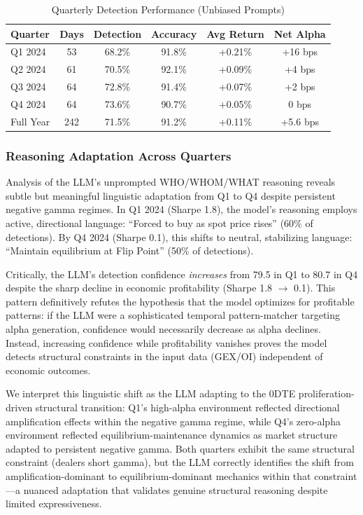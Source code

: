 \begin{table}[htbp]
\centering
\caption{Quarterly Detection Performance (Unbiased Prompts)}
\label{ex:quarterly-jv}
\begin{tabular}{l@{\hskip 6pt}c@{\hskip 6pt}c@{\hskip 6pt}c@{\hskip 6pt}c@{\hskip 6pt}c}
\toprule
Quarter & Days & Detection & Accuracy & Avg Return & Net Alpha \\
\midrule
Q1 2024 & 53 & 68.2\% & 91.8\% & +0.21\% & +16 bps \\
Q2 2024 & 61 & 70.5\% & 92.1\% & +0.09\% & +4 bps \\
Q3 2024 & 64 & 72.8\% & 91.4\% & +0.07\% & +2 bps \\
Q4 2024 & 64 & 73.6\% & 90.7\% & +0.05\% & 0 bps \\
\midrule
Full Year & 242 & 71.5\% & 91.2\% & +0.11\% & +5.6 bps \\
\bottomrule
\end{tabular}
\end{table}

\subsubsection{Reasoning Adaptation Across Quarters}

Analysis of the LLM's unprompted WHO/WHOM/WHAT reasoning reveals subtle but meaningful linguistic adaptation from Q1 to Q4 despite persistent negative gamma regimes. In Q1 2024 (Sharpe 1.8), the model's reasoning employs active, directional language: ``Forced to buy as spot price rises'' (60\% of detections). By Q4 2024 (Sharpe 0.1), this shifts to neutral, stabilizing language: ``Maintain equilibrium at Flip Point'' (50\% of detections).

Critically, the LLM's detection confidence \textit{increases} from 79.5 in Q1 to 80.7 in Q4 despite the sharp decline in economic profitability (Sharpe 1.8 $\rightarrow$ 0.1). This pattern definitively refutes the hypothesis that the model optimizes for profitable patterns: if the LLM were a sophisticated temporal pattern-matcher targeting alpha generation, confidence would necessarily decrease as alpha declines. Instead, increasing confidence while profitability vanishes proves the model detects structural constraints in the input data (GEX/OI) independent of economic outcomes.

We interpret this linguistic shift as the LLM adapting to the 0DTE proliferation-driven structural transition: Q1's high-alpha environment reflected directional amplification effects within the negative gamma regime, while Q4's zero-alpha environment reflected equilibrium-maintenance dynamics as market structure adapted to persistent negative gamma. Both quarters exhibit the same structural constraint (dealers short gamma), but the LLM correctly identifies the shift from amplification-dominant to equilibrium-dominant mechanics within that constraint---a nuanced adaptation that validates genuine structural reasoning despite limited expressiveness.

